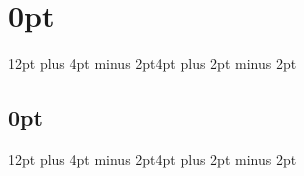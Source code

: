 
\usepackage{multicol}
\usepackage{fontspec}
\usepackage{marvosym}
\usepackage{fontawesome}
\usepackage{orcidlink}
\usepackage{enumitem}
\usepackage{calc}
\usepackage{array}
\usepackage{xcolor}

\newcommand\VRule{\color{lightgray}\vrule width 0.5pt}

\usepackage{sectsty}
\sectionfont{\rmfamily\mdseries\large\bf}
\subsectionfont{\rmfamily\mdseries\normalsize\itshape}

\usepackage{titlesec}
\titlespacing\section{0pt}{12pt plus 4pt minus 2pt}{4pt plus 2pt minus 2pt}
\titlespacing\subsection{0pt}{12pt plus 4pt minus 2pt}{4pt plus 2pt minus 2pt}

\renewenvironment{itemize}{%
  \begin{list}{}{\setlength{\leftmargin}{1.5em}}%
}{%
  \end{list}%
}

\usepackage{parskip}

\usepackage{fancyhdr}
\usepackage{lastpage}
\makeatletter
\AtBeginDocument{%
  \let\qkitcvauthor\@author
  \let\qkitcvtitle\@title
}
\makeatother
\pagestyle{fancy}
\renewcommand{\headrulewidth}{0pt}
\renewcommand{\footrulewidth}{0pt}
\lhead{}
\chead{}
\rhead{}
\lfoot{}
\cfoot{\scriptsize \qkitcvauthor\ - \qkitcvtitle}
\rfoot{\scriptsize \thepage/{\hypersetup{linkcolor=black}\pageref{LastPage}}}

